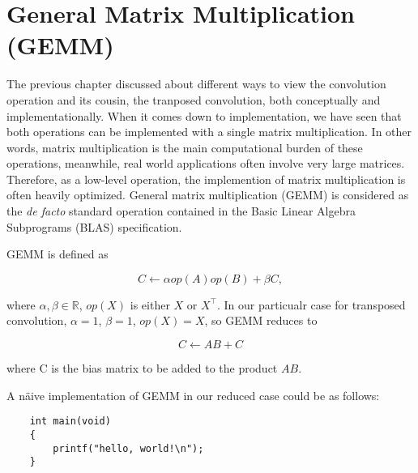 
\chapter{General Matrix Multiplication (GEMM)}

The previous chapter discussed about different ways to view the convolution operation and its cousin,
the tranposed convolution, both conceptually and implementationally. When it comes down to implementation,
we have seen that both operations can be implemented with a single matrix multiplication. In other words,
matrix multiplication is the main computational burden of these operations, meanwhile, real world applications
often involve very large matrices. Therefore, as a low-level operation, the implemention of matrix
multiplication is often heavily optimized. General matrix multiplication (GEMM) is considered as the
\textit{de facto} standard operation contained in the Basic Linear Algebra Subprograms (BLAS)
specification.

GEMM is defined as

$$C \leftarrow \alpha op(A) op(B) + \beta C,$$

where $\alpha, \beta \in \mathbb{R}$, $op(X)$ is either $X$ or $X^\intercal$. In our particualr case for transposed convolution, $\alpha = 1$, $\beta = 1$, $op(X) = X$, so GEMM reduces to

$$C \leftarrow A B + C$$

where C is the bias matrix to be added to the product $A B$.

A näive implementation of GEMM in our reduced case could be as follows:

\begin{code}
  \begin{verbatim}
    int main(void)
    {
        printf("hello, world!\n");
    }
  \end{verbatim}
  \label{code:naivegemm}
\end{code}

\clearpage %
